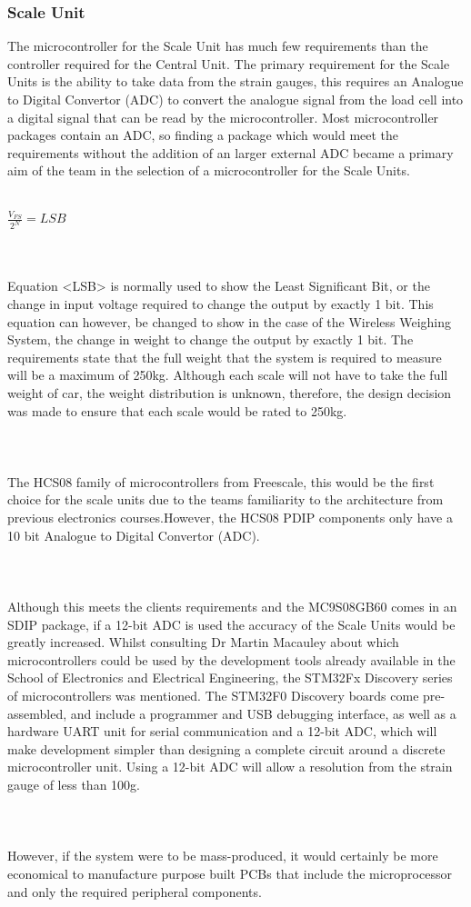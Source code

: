 \subsubsection{Scale Unit}
The microcontroller for the Scale Unit has much few requirements than the controller required for the Central Unit. The primary requirement for the Scale Units is the ability to take data from the strain gauges, this requires an Analogue to Digital Convertor (ADC) to convert the analogue signal from the load cell into a digital signal that can be read by the microcontroller. Most microcontroller packages contain an ADC, so finding a package which would meet the requirements without the addition of an larger external ADC became a primary aim of the team in the selection of a microcontroller for the Scale Units. \\\\
\centerline{\(\frac{V_{FS}}{2^{N}} = LSB  \)}%
\\\\
Equation <LSB> is normally used to show the Least Significant Bit, or the change in input voltage required to change the output by exactly 1 bit. This equation can however, be changed to show in the case of the Wireless Weighing System, the change in weight to change the output by exactly 1 bit.
The requirements state that the full weight that the system is required to measure will be a maximum of 250kg. Although each scale will not have to take the full weight of car, the weight distribution is unknown, therefore, the design decision was made to ensure that each scale would be rated to 250kg.  \\\\
\\\\
The HCS08 family of microcontrollers from Freescale, this would be the first choice for the scale units due to the teams familiarity to the architecture from previous electronics courses.However, the HCS08 PDIP components only have a 10 bit Analogue to Digital Convertor (ADC).   \\\\
\\\\
Although this meets the clients requirements and the MC9S08GB60 comes in an SDIP package, if a 12-bit ADC is used the accuracy of the Scale Units would be greatly increased. Whilst consulting Dr Martin Macauley about which microcontrollers could be used by the development tools already available in the School of Electronics and Electrical Engineering, the STM32Fx Discovery series of microcontrollers was mentioned. The STM32F0 Discovery boards come pre-assembled, and include a programmer and USB debugging interface, as well as a hardware UART unit for serial communication and a 12-bit ADC, which will make development simpler than designing a complete circuit around a discrete microcontroller unit.  Using a 12-bit ADC will allow a resolution from the strain gauge of less than 100g. \\\\
\\\\
However, if the system were to be mass-produced, it would certainly be more economical to manufacture purpose built PCBs that include the microprocessor and only the required peripheral components. \\\\
